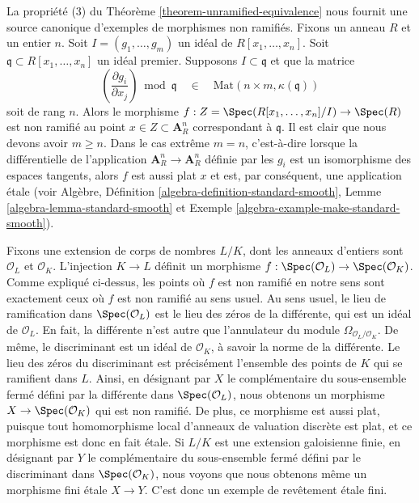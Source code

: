 \begin{example}
\label{example-standard-etale}
La propriété (3) du
Théorème \ref{theorem-unramified-equivalence}
nous fournit une source canonique d'exemples de morphismes non ramifiés.
Fixons un anneau $R$ et un entier $n$. Soit $I = (g_1, \ldots, g_m)$ un
idéal de $R[x_1, \ldots, x_n]$. Soit $\mathfrak q \subset R[x_1, \ldots, x_n]$
un idéal premier. Supposons $I \subset \mathfrak q$ et que la matrice
$$
\left(\frac{\partial g_i}{\partial x_j}\right) \bmod \mathfrak q
\quad\in\quad
\text{Mat}(n \times m, \kappa(\mathfrak q))
$$
soit de rang $n$. Alors le morphisme
$f : Z = \Spec(R[x_1, \ldots, x_n]/I) \to \Spec(R)$
est non ramifié au point $x \in Z \subset \mathbf{A}^n_R$ correspondant
à $\mathfrak q$. Il est clair que nous devons avoir $m \geq n$.
Dans le cas extrême $m = n$, c'est-à-dire lorsque la différentielle de l'application
$\mathbf{A}^n_R \to \mathbf{A}^n_R$ définie par les $g_i$
est un isomorphisme des espaces tangents, alors $f$ est aussi plat
$x$ et est, par conséquent, une application \'etale (voir Algèbre,
Définition \ref{algebra-definition-standard-smooth},
Lemme \ref{algebra-lemma-standard-smooth} et
Exemple \ref{algebra-example-make-standard-smooth}).
\end{example}

\begin{example}
\label{example-number-theory-etale}
Fixons une extension de corps de nombres $L/K$, dont les anneaux d'entiers sont
$\mathcal{O}_L$ et $\mathcal{O}_K$. L'injection $K \to L$ définit un
morphisme $f : \Spec(\mathcal{O}_L) \to \Spec(\mathcal{O}_K)$.
Comme expliqué ci-dessus, les points où $f$ est non ramifié en notre sens
sont exactement ceux où $f$ est non ramifié au sens
usuel. Au sens usuel, le lieu de ramification dans
$\Spec(\mathcal{O}_L)$ est le lieu des zéros de la
différente, qui est un idéal de $\mathcal{O}_L$. En fait, la différente
n'est autre que l'annulateur du module
$\Omega_{\mathcal{O}_L/\mathcal{O}_K}$. De même, le
discriminant est un idéal de $\mathcal{O}_K$, à savoir la
norme de la différente.
Le lieu des zéros du discriminant est précisément l'ensemble
des points de $K$ qui se ramifient dans $L$.
Ainsi, en désignant par $X$ le complémentaire du sous-ensemble fermé
défini par la différente dans $\Spec(\mathcal{O}_L)$,
nous obtenons un morphisme $X \to \Spec(\mathcal{O}_K)$ qui est non ramifié.
De plus, ce morphisme est aussi plat, puisque tout homomorphisme local
d'anneaux de valuation discrète est plat, et ce morphisme est donc
en fait \'etale. Si $L/K$ est une extension galoisienne finie, en désignant par
$Y$ le complémentaire du sous-ensemble fermé défini par le discriminant dans
$\Spec(\mathcal{O}_K)$, nous voyons que nous obtenons même un
morphisme fini \'etale $X \to Y$.
C'est donc un exemple de revêtement \'etale fini.
\end{example}





